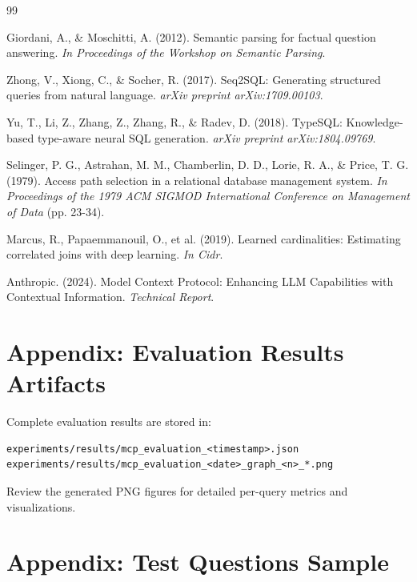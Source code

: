 \documentclass[11pt,a4paper]{article}
\begin{document}
\begin{thebibliography}{99}

Giordani, A., \& Moschitti, A. (2012). Semantic parsing for factual question answering. \textit{In Proceedings of the Workshop on Semantic Parsing}.

Zhong, V., Xiong, C., \& Socher, R. (2017). Seq2SQL: Generating structured queries from natural language. \textit{arXiv preprint arXiv:1709.00103}.

Yu, T., Li, Z., Zhang, Z., Zhang, R., \& Radev, D. (2018). TypeSQL: Knowledge-based type-aware neural SQL generation. \textit{arXiv preprint arXiv:1804.09769}.

Selinger, P. G., Astrahan, M. M., Chamberlin, D. D., Lorie, R. A., \& Price, T. G. (1979). Access path selection in a relational database management system. \textit{In Proceedings of the 1979 ACM SIGMOD International Conference on Management of Data} (pp. 23-34).

Marcus, R., Papaemmanouil, O., et al. (2019). Learned cardinalities: Estimating correlated joins with deep learning. \textit{In Cidr}.

Anthropic. (2024). Model Context Protocol: Enhancing LLM Capabilities with Contextual Information. \textit{Technical Report}.

\end{thebibliography}

\appendix

\section{Appendix: Evaluation Results Artifacts}
\label{app:artifacts}

Complete evaluation results are stored in:
\begin{verbatim}
experiments/results/mcp_evaluation_<timestamp>.json
experiments/results/mcp_evaluation_<date>_graph_<n>_*.png
\end{verbatim}

Review the generated PNG figures for detailed per-query metrics and visualizations.

\section{Appendix: Test Questions Sample}
\label{app:test_questions}
\end{document}
